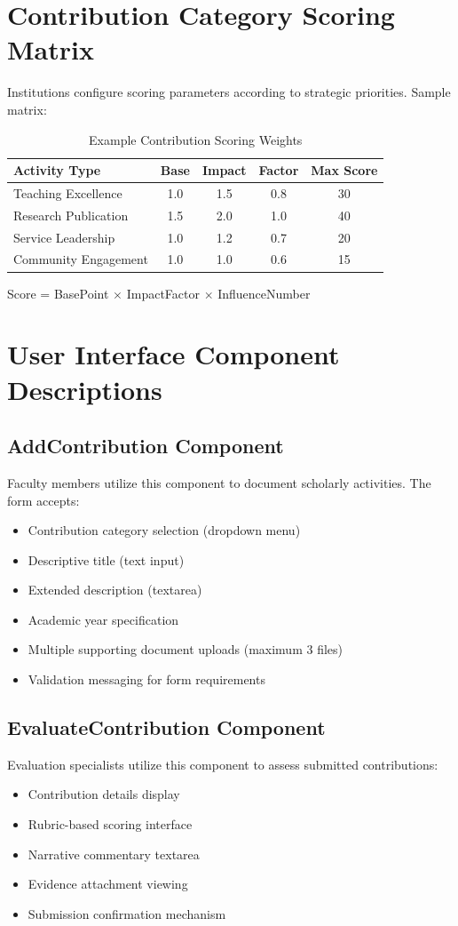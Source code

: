\documentclass[conference]{IEEEtran}
\begin{document}
\section{Contribution Category Scoring Matrix}
\label{appx:scoring}

Institutions configure scoring parameters according to strategic priorities. Sample matrix:

\begin{table}[!h]
\centering
\caption{Example Contribution Scoring Weights}
\begin{tabular}{|l|c|c|c|c|}
\hline
\textbf{Activity Type} & \textbf{Base} & \textbf{Impact} & \textbf{Factor} & \textbf{Max Score} \\
\hline
Teaching Excellence & 1.0 & 1.5 & 0.8 & 30 \\
Research Publication & 1.5 & 2.0 & 1.0 & 40 \\
Service Leadership & 1.0 & 1.2 & 0.7 & 20 \\
Community Engagement & 1.0 & 1.0 & 0.6 & 15 \\
\hline
\end{tabular}
\end{table}

Score = BasePoint $\times$ ImpactFactor $\times$ InfluenceNumber

\section{User Interface Component Descriptions}
\label{appx:components}

\subsection{AddContribution Component}
Faculty members utilize this component to document scholarly activities. The form accepts:
\begin{itemize}
\item Contribution category selection (dropdown menu)
\item Descriptive title (text input)
\item Extended description (textarea)
\item Academic year specification
\item Multiple supporting document uploads (maximum 3 files)
\item Validation messaging for form requirements
\end{itemize}

\subsection{EvaluateContribution Component}
Evaluation specialists utilize this component to assess submitted contributions:
\begin{itemize}
\item Contribution details display
\item Rubric-based scoring interface
\item Narrative commentary textarea
\item Evidence attachment viewing
\item Submission confirmation mechanism
\end{itemize}
\end{document}
